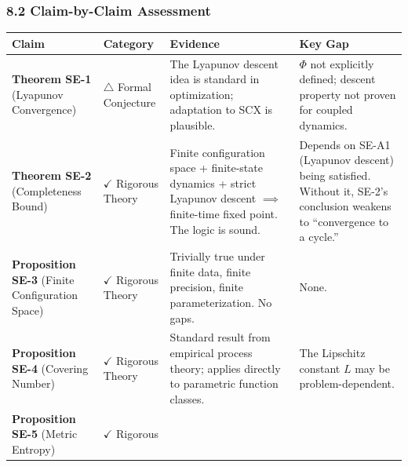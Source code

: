 \documentclass[
  12pt,
]{ctexart}
\begin{document}
\subsubsection{8.2 Claim-by-Claim
Assessment}\label{claim-by-claim-assessment}

\begin{longtable}[]{@{}
  >{\raggedright\arraybackslash}p{}
  >{\raggedright\arraybackslash}p{}
  >{\raggedright\arraybackslash}p{}
  >{\raggedright\arraybackslash}p{}@{}}
\toprule\noalign{}
\begin{minipage}[b]{\linewidth}\raggedright
Claim
\end{minipage} & \begin{minipage}[b]{\linewidth}\raggedright
Category
\end{minipage} & \begin{minipage}[b]{\linewidth}\raggedright
Evidence
\end{minipage} & \begin{minipage}[b]{\linewidth}\raggedright
Key Gap
\end{minipage} \\
\midrule\noalign{}
\endhead
\bottomrule\noalign{}
\endlastfoot
\textbf{Theorem SE-1} (Lyapunov Convergence) & \(\triangle\) Formal
Conjecture & The Lyapunov descent idea is standard in optimization;
adaptation to SCX is plausible. & \(\Phi\) not explicitly defined;
descent property not proven for coupled dynamics. \\
\textbf{Theorem SE-2} (Completeness Bound) & \(\checkmark\) Rigorous
Theory & Finite configuration space + finite-state dynamics + strict
Lyapunov descent \(\implies\) finite-time fixed point. The logic is
sound. & Depends on SE-A1 (Lyapunov descent) being satisfied. Without
it, SE-2's conclusion weakens to ``convergence to a cycle.'' \\
\textbf{Proposition SE-3} (Finite Configuration Space) & \(\checkmark\)
Rigorous Theory & Trivially true under finite data, finite precision,
finite parameterization. No gaps. & None. \\
\textbf{Proposition SE-4} (Covering Number) & \(\checkmark\) Rigorous
Theory & Standard result from empirical process theory; applies directly
to parametric function classes. & The Lipschitz constant \(L\) may be
problem-dependent. \\
\textbf{Proposition SE-5} (Metric Entropy) & \(\checkmark\) Rigorous

\end{longtable}
\end{document}
